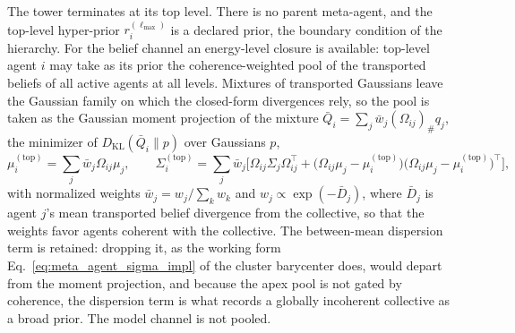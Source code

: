 \documentclass[11pt]{article}
\begin{document}
The tower terminates at its top level. There is no parent meta-agent, and the top-level hyper-prior $r_i^{(\ell_{\max})}$ is a declared prior, the boundary condition of the hierarchy. For the belief channel an energy-level closure is available: top-level agent $i$ may take as its prior the coherence-weighted pool of the transported beliefs of all active agents at all levels. Mixtures of transported Gaussians leave the Gaussian family on which the closed-form divergences rely, so the pool is taken as the Gaussian moment projection of the mixture $\bar Q_i = \sum_j \bar w_j (\Omega_{ij})_{\#} q_j$, the minimizer of $D_{\mathrm{KL}}(\bar Q_i \| p)$ over Gaussians $p$,
\begin{equation}
\mu_i^{(\mathrm{top})} = \sum_j \bar w_j \Omega_{ij}\mu_j,
\qquad
\Sigma_i^{(\mathrm{top})} = \sum_j \bar w_j \Big[\Omega_{ij} \Sigma_j \Omega_{ij}^\top + \big(\Omega_{ij}\mu_j - \mu_i^{(\mathrm{top})}\big)\big(\Omega_{ij}\mu_j - \mu_i^{(\mathrm{top})}\big)^\top\Big],
\end{equation}
with normalized weights $\bar w_j = w_j / \sum_k w_k$ and $w_j \propto \exp(-\bar D_j)$, where $\bar D_j$ is agent $j$'s mean transported belief divergence from the collective, so that the weights favor agents coherent with the collective. The between-mean dispersion term is retained: dropping it, as the working form Eq.~\eqref{eq:meta_agent_sigma_impl} of the cluster barycenter does, would depart from the moment projection, and because the apex pool is not gated by coherence, the dispersion term is what records a globally incoherent collective as a broad prior. The model channel is not pooled.
\end{document}
